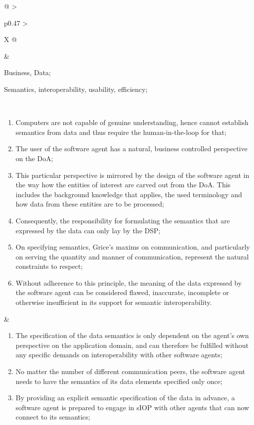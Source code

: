 \begin{xltabular}[l]{\linewidth}{@{} >{\small\raggedright\arraybackslash}p{0.47\linewidth} >{\small\raggedright\arraybackslash}X @{}}
\begin{mmdp}
\end{mmdp}
&
\begin{description}[labelwidth=3.7cm,leftmargin=3.7cm+1ex,nosep,topsep=2ex,labelsep=1ex,font=\bfseries]
  \item[Type of information:] Business, Data;
  \item[Quality attributes:] Semantics, interoperability, usability, efficiency;
\end{description} \\
\begin{enumerate}[left=6pt, nosep]
  \item Computers are not capable of genuine understanding, hence cannot establish semantics from data and thus require the human-in-the-loop for that;
  \item The user of the software agent has a natural, business controlled perspective on the DoA;
  \item This particular perspective is mirrored by the design of the software agent in the way how the entities of interest are carved out from the DoA. This includes the background knowledge that applies, the used terminology and how data from these entities are to be processed;
  \item Consequently, the responsibility for formulating the semantics that are expressed by the data can only lay by the DSP;
  \item On specifying semantics, Grice’s maxims on communication, and particularly on serving the quantity and manner of communication, represent the natural constraints to respect;
  \item Without adherence to this principle, the meaning of the data expressed by the software agent can be considered flawed, inaccurate, incomplete or otherwise insufficient in its support for semantic interoperability.
\end{enumerate}
&
\begin{enumerate}[left=10pt, nosep]
  \item The specification of the data semantics is only dependent on the agent’s own perspective on the application domain, and can therefore be fulfilled without any specific demands on interoperability with other software agents;
  \item No matter the number of different communication peers, the software agent needs to have the semantics of its data elements specified only once;
  \item By providing an explicit semantic specification of the data in advance, a software agent is prepared to engage in sIOP with other agents that can now connect to its semantics;

\end{enumerate}
\end{xltabular}
